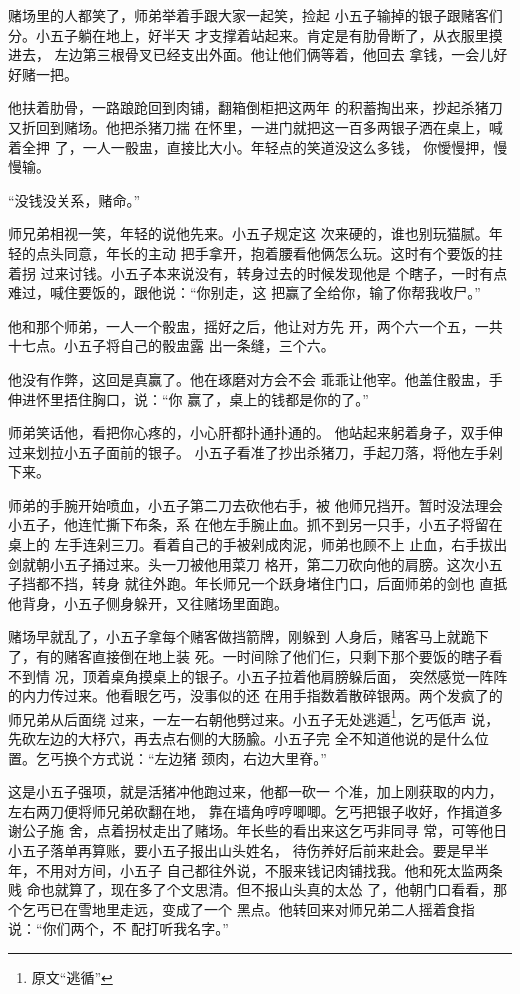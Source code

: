 赌场里的人都笑了，师弟举着手跟大家一起笑，捡起
小五子输掉的银子跟赌客们分。小五子躺在地上，好半天
才支撑着站起来。肯定是有肋骨断了，从衣服里摸进去，
左边第三根骨叉已经支出外面。他让他们俩等着，他回去
拿钱，一会儿好好赌一把。

他扶着肋骨，一路踉跄回到肉铺，翻箱倒柜把这两年
的积蓄掏出来，抄起杀猪刀又折回到赌场。他把杀猪刀揣
在怀里，一进门就把这一百多两银子洒在桌上，喊着全押
了，一人一骰盅，直接比大小。年轻点的笑道没这么多钱，
你懓慢押，慢慢输。

“没钱没关系，赌命。”

师兄弟相视一笑，年轻的说他先来。小五子规定这
次来硬的，谁也别玩猫腻。年轻的点头同意，年长的主动
把手拿开，抱着腰看他俩怎么玩。这时有个要饭的拄着拐
过来讨钱。小五子本来说没有，转身过去的时候发现他是
个瞎子，一时有点难过，喊住要饭的，跟他说：“你别走，这
把赢了全给你，输了你帮我收尸。”

他和那个师弟，一人一个骰盅，摇好之后，他让对方先
开，两个六一个五，一共十七点。小五子将自己的骰盅露
出一条缝，三个六。

他没有作弊，这回是真赢了。他在琢磨对方会不会
乖乖让他宰。他盖住骰盅，手伸进怀里捂住胸口，说：“你
赢了，桌上的钱都是你的了。”

师弟笑话他，看把你心疼的，小心肝都扑通扑通的。
他站起来躬着身子，双手伸过来划拉小五子面前的银子。
小五子看准了抄出杀猪刀，手起刀落，将他左手剁下来。

师弟的手腕开始喷血，小五子第二刀去砍他右手，被
他师兄挡开。暂时没法理会小五子，他连忙撕下布条，系
在他左手腕止血。抓不到另一只手，小五子将留在桌上的
左手连剁三刀。看着自己的手被剁成肉泥，师弟也顾不上
止血，右手拔出剑就朝小五子捅过来。头一刀被他用菜刀
格开，第二刀砍向他的肩膀。这次小五子挡都不挡，转身
就往外跑。年长师兄一个跃身堵住门口，后面师弟的剑也
直抵他背身，小五子侧身躲开，又往赌场里面跑。

赌场早就乱了，小五子拿每个赌客做挡箭牌，刚躲到
人身后，赌客马上就跪下了，有的赌客直接倒在地上装
死。一时间除了他们仨，只剩下那个要饭的瞎子看不到情
况，顶着桌角摸桌上的银子。小五子拉着他肩膀躲后面，
突然感觉一阵阵的内力传过来。他看眼乞丐，没事似的还
在用手指数着散碎银两。两个发疯了的师兄弟从后面绕
过来，一左一右朝他劈过来。小五子无处逃遁\footnote{原文“逃循”}，乞丐低声
说，先砍左边的大杼穴，再去点右侧的大肠腧。小五子完
全不知道他说的是什么位置。乞丐换个方式说：“左边猪
颈肉，右边大里脊。”

这是小五子强项，就是活猪冲他跑过来，他都一砍一
个准，加上刚获取的内力，左右两刀便将师兄弟砍翻在地，
靠在墙角哼哼唧唧。乞丐把银子收好，作揖道多谢公子施
舍，点着拐杖走出了赌场。年长些的看出来这乞丐非同寻
常，可等他日小五子落单再算账，要小五子报出山头姓名，
待伤养好后前来赴会。要是早半年，不用对方间，小五子
自己都往外说，不服来钱记肉铺找我。他和死太监两条贱
命也就算了，现在多了个文思清。但不报山头真的太怂
了，他朝门口看看，那个乞丐已在雪地里走远，变成了一个
黑点。他转回来对师兄弟二人摇着食指说：“你们两个，不
配打听我名字。”
\newline


